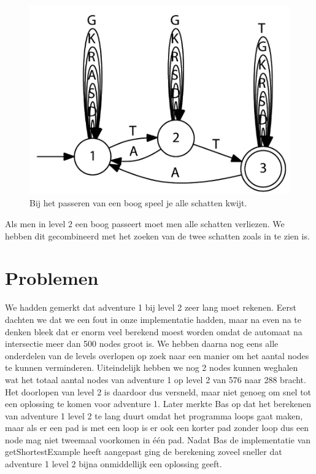 \documentclass[a4paper, 11pt]{article}
\begin{document}
		
		\begin{figure}
			\centering
			\includegraphics[width=0.4\linewidth]{boog}
			\caption{Bij het passeren van een boog speel je alle schatten kwijt.}
			\label{fig:boog}
		\end{figure}
		
		Als men in level 2 een boog passeert moet men alle schatten verliezen. We hebben dit gecombineerd met het zoeken van de twee schatten zoals in  te zien is.
	
	\section{Problemen}
		We hadden gemerkt dat adventure 1 bij level 2 zeer lang moet rekenen. Eerst dachten we dat we een fout in onze implementatie hadden, maar na even na te denken bleek dat er enorm veel berekend moest worden omdat de automaat na intersectie meer dan 500 nodes groot is. We hebben daarna nog eens alle onderdelen van de levels overlopen op zoek naar een manier om het aantal nodes te kunnen verminderen. Uiteindelijk hebben we nog 2 nodes kunnen weghalen wat het totaal aantal nodes van adventure 1 op level 2 van 576 naar 288 bracht. Het doorlopen van level 2 is daardoor dus versneld, maar niet genoeg om snel tot een oplossing te komen voor adventure 1.
		Later merkte Bas op dat het berekenen van adventure 1 level 2 te lang duurt omdat het programma loops gaat maken, maar als er een pad is met een loop is er ook een korter pad zonder loop dus een node mag niet tweemaal voorkomen in één pad. Nadat Bas de implementatie van getShortestExample heeft aangepast ging de berekening zoveel sneller dat adventure 1 level 2 bijna onmiddellijk een oplossing geeft.
	
	
	
	
	
	
	
	
	
	
	
\end{document}
